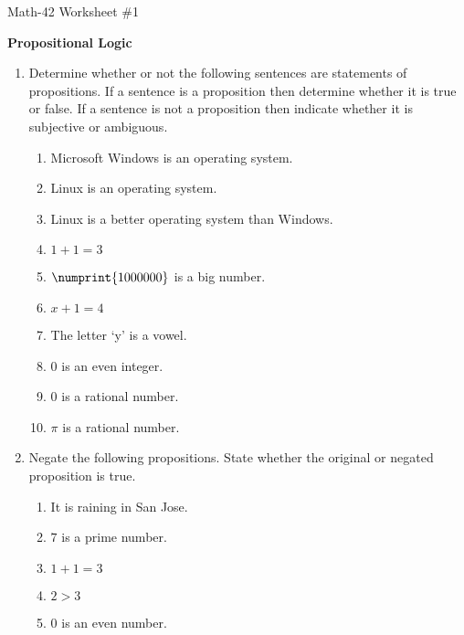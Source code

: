 \documentclass[letterpaper,12pt,fleqn]{article}
\begin{document}
\begin{center}
  \large Math-42 Worksheet \#1

  \textbf{Propositional Logic}
\end{center}

\vspace{0.5in}

\begin{enumerate}[left=0in,itemsep=0.5in]
\item Determine whether or not the following sentences are statements of propositions.  If a sentence
  is a proposition then determine whether it is true or false.  If a sentence is not a proposition then indicate
  whether it is subjective or ambiguous.
  \begin{enumerate}
  \item Microsoft Windows is an operating system.
  \item Linux is an operating system.
  \item Linux is a better operating system than Windows.
  \item \(1+1=3\)
  \item \(\numprint{1000000}\) is a big number.
  \item \(x+1=4\)
  \item The letter `y' is a vowel.
  \item \(0\) is an even integer.
  \item \(0\) is a rational number.
  \item \(\pi\) is a rational number.
  \end{enumerate}

\item Negate the following propositions.  State whether the original or negated proposition is true.
  \begin{enumerate}
  \item It is raining in San Jose.
  \item \(7\) is a prime number.
  \item \(1+1=3\)
  \item \(2>3\)
  \item \(0\) is an even number.
  \end{enumerate}


\end{enumerate}
\end{document}
